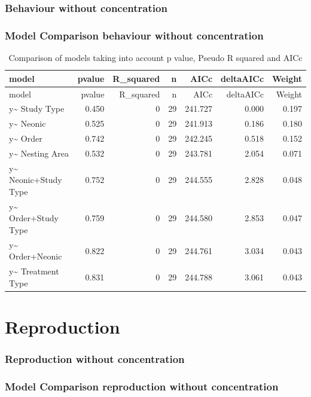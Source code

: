 \documentclass[]{elsarticle} %
\begin{document}
\subsubsection{Behaviour without
concentration}\label{behaviour-without-concentration}

\subsubsection{Model Comparison behaviour without
concentration}\label{model-comparison-behaviour-without-concentration}

\begin{longtable}[c]{@{}lrrrrrr@{}}
\caption{Comparison of models taking into account p value, Pseudo R
squared and AICc}\tabularnewline
\toprule
model & pvalue & R\_squared & n & AICc & deltaAICc &
Weight\tabularnewline
\midrule
\endfirsthead
\toprule
model & pvalue & R\_squared & n & AICc & deltaAICc &
Weight\tabularnewline
\midrule
\endhead
y\textasciitilde{} Study Type & 0.450 & 0 & 29 & 241.727 & 0.000 &
0.197\tabularnewline
y\textasciitilde{} Neonic & 0.525 & 0 & 29 & 241.913 & 0.186 &
0.180\tabularnewline
y\textasciitilde{} Order & 0.742 & 0 & 29 & 242.245 & 0.518 &
0.152\tabularnewline
y\textasciitilde{} Nesting Area & 0.532 & 0 & 29 & 243.781 & 2.054 &
0.071\tabularnewline
y\textasciitilde{} Neonic+Study Type & 0.752 & 0 & 29 & 244.555 & 2.828
& 0.048\tabularnewline
y\textasciitilde{} Order+Study Type & 0.759 & 0 & 29 & 244.580 & 2.853 &
0.047\tabularnewline
y\textasciitilde{} Order+Neonic & 0.822 & 0 & 29 & 244.761 & 3.034 &
0.043\tabularnewline
y\textasciitilde{} Treatment Type & 0.831 & 0 & 29 & 244.788 & 3.061 &
0.043\tabularnewline
\bottomrule
\end{longtable}

\section{Reproduction}\label{reproduction}

\subsubsection{Reproduction without
concentration}\label{reproduction-without-concentration}

\subsubsection{Model Comparison reproduction without
concentration}\label{model-comparison-reproduction-without-concentration}
\end{document}
